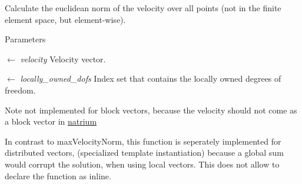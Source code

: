 Calculate the euclidean norm of the velocity over all points (not in the finite element space, but element-\/wise). 
\begin{DoxyParams}{Parameters}
\item[\mbox{$\leftarrow$} {\em velocity}]Velocity vector. \item[\mbox{$\leftarrow$} {\em locally\_\-owned\_\-dofs}]Index set that contains the locally owned degrees of freedom. \end{DoxyParams}
\begin{DoxyNote}{Note}
not implemented for block vectors, because the velocity should not come as a block vector in \hyperlink{namespacenatrium}{natrium} 

In contrast to maxVelocityNorm, this function is seperately implemented for distributed vectors, (specialized template instantiation) because a global sum would corrupt the solution, when using local vectors. This does not allow to declare the function as inline. 
\end{DoxyNote}
